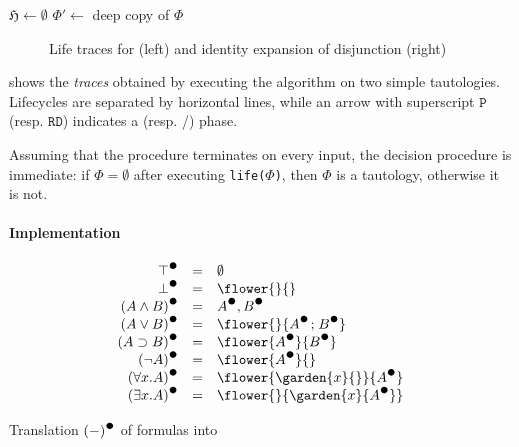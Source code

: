\begin{scope}
\begin{procedure}[H]
  $\mathfrak{H} \longleftarrow \emptyset$\;
  $\Phi' \longleftarrow $ deep copy of $\Phi$\;
  \;
\end{procedure}

\begin{figure*}
  
  \caption{Life traces for  (left) and identity expansion of
  disjunction (right)}
\end{figure*}

 shows the \emph{traces} obtained by executing the algorithm
on two simple tautologies. Lifecycles are separated by horizontal lines, while
an arrow with superscript $\mathtt{P}$ (resp. $\mathtt{RD}$) indicates a
 (resp. /) phase.

Assuming that the  procedure terminates on every input, the
decision procedure is immediate: if $\Phi = \emptyset$ after executing
\texttt{life($\Phi$)}, then $\Phi$ is a tautology, otherwise it is not.

\paragraph{Implementation}

\begin{marginfigure}
  $$
  \begin{array}{r@{\quad=\quad}l}
    \dtrans{\top} & \emptyset \\
    \dtrans{\bot} & \flower{}{} \\
    \dtrans{(A \land B)} & \dtrans{A}, \dtrans{B} \\
    \dtrans{(A \lor B)} & \flower{}{\dtrans{A} \sep \dtrans{B}} \\
    \dtrans{(A \limp B)} & \flower{\dtrans{A}}{\dtrans{B}} \\
    \dtrans{(\neg A)} & \flower{\dtrans{A}}{} \\
    \dtrans{(\forall x. A)} & \flower{\garden{x}{{}}}{\dtrans{A}} \\
    \dtrans{(\exists x. A)} & \flower{}{\garden{x}{\dtrans{A}}}
  \end{array}
  $$
  \caption{Translation $\dtrans{(-)}$ of formulas into }
\end{marginfigure}


\end{scope}
